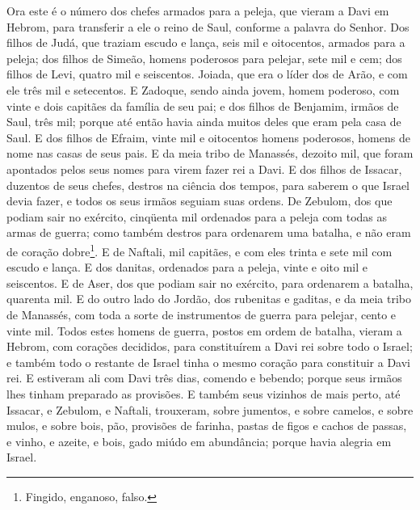 Ora este é o número dos chefes armados para a peleja, que vieram
a Davi em Hebrom, para transferir a ele o reino de Saul, conforme a
palavra do Senhor. Dos filhos de Judá, que traziam escudo e
lança, seis mil e oitocentos, armados para a peleja; dos
filhos de Simeão, homens poderosos para pelejar, sete mil e cem;
dos filhos de Levi, quatro mil e seiscentos. Joiada,
que era o líder dos de Arão, e com ele três mil e setecentos.
E Zadoque, sendo ainda jovem, homem poderoso, com vinte e
dois capitães da família de seu pai; e dos filhos de
Benjamim, irmãos de Saul, três mil; porque até então havia ainda
muitos deles que eram pela casa de Saul. E dos filhos de
Efraim, vinte mil e oitocentos homens poderosos, homens de nome nas
casas de seus pais. E da meia tribo de Manassés, dezoito mil,
que foram apontados pelos seus nomes para virem fazer rei a Davi.
E dos filhos de Issacar, duzentos de seus chefes, destros na
ciência dos tempos, para saberem o que Israel devia fazer, e todos
os seus irmãos seguiam suas ordens. De Zebulom, dos que
podiam sair no exército, cinqüenta mil ordenados para a peleja com
todas as armas de guerra; como também destros para ordenarem uma
batalha, e não eram de coração dobre\footnote{Fingido, enganoso,
falso.}. E de Naftali, mil capitães, e com eles trinta e sete
mil com escudo e lança. E dos danitas, ordenados para a
peleja, vinte e oito mil e seiscentos. E de Aser, dos que
podiam sair no exército, para ordenarem a batalha, quarenta mil.
E do outro lado do Jordão, dos rubenitas e gaditas, e da meia
tribo de Manassés, com toda a sorte de instrumentos de guerra para
pelejar, cento e vinte mil. Todos estes homens de guerra,
postos em ordem de batalha, vieram a Hebrom, com corações decididos,
para constituírem a Davi rei sobre todo o Israel; e também todo o
restante de Israel tinha o mesmo coração para constituir a Davi rei.
E estiveram ali com Davi três dias, comendo e bebendo; porque
seus irmãos lhes tinham preparado as provisões. E também seus
vizinhos de mais perto, até Issacar, e Zebulom, e Naftali,
trouxeram, sobre jumentos, e sobre camelos, e sobre mulos, e sobre
bois, pão, provisões de farinha, pastas de figos e cachos de passas,
e vinho, e azeite, e bois, gado miúdo em abundância; porque havia
alegria em Israel.

\medskip

